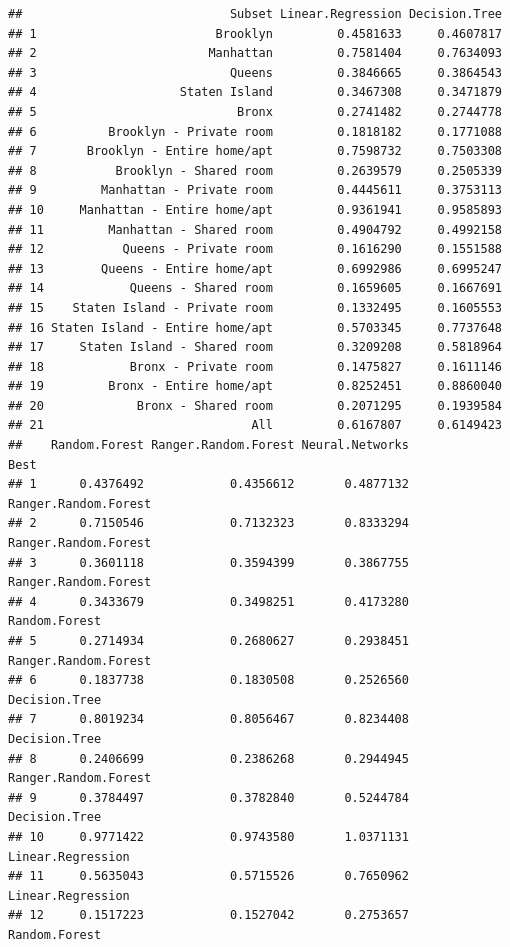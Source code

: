 \documentclass[
]{article}
\begin{document}
\begin{verbatim}
##                             Subset Linear.Regression Decision.Tree
## 1                         Brooklyn         0.4581633     0.4607817
## 2                        Manhattan         0.7581404     0.7634093
## 3                           Queens         0.3846665     0.3864543
## 4                    Staten Island         0.3467308     0.3471879
## 5                            Bronx         0.2741482     0.2744778
## 6          Brooklyn - Private room         0.1818182     0.1771088
## 7       Brooklyn - Entire home/apt         0.7598732     0.7503308
## 8           Brooklyn - Shared room         0.2639579     0.2505339
## 9         Manhattan - Private room         0.4445611     0.3753113
## 10     Manhattan - Entire home/apt         0.9361941     0.9585893
## 11         Manhattan - Shared room         0.4904792     0.4992158
## 12           Queens - Private room         0.1616290     0.1551588
## 13        Queens - Entire home/apt         0.6992986     0.6995247
## 14            Queens - Shared room         0.1659605     0.1667691
## 15    Staten Island - Private room         0.1332495     0.1605553
## 16 Staten Island - Entire home/apt         0.5703345     0.7737648
## 17     Staten Island - Shared room         0.3209208     0.5818964
## 18            Bronx - Private room         0.1475827     0.1611146
## 19         Bronx - Entire home/apt         0.8252451     0.8860040
## 20             Bronx - Shared room         0.2071295     0.1939584
## 21                             All         0.6167807     0.6149423
##    Random.Forest Ranger.Random.Forest Neural.Networks                 Best
## 1      0.4376492            0.4356612       0.4877132 Ranger.Random.Forest
## 2      0.7150546            0.7132323       0.8333294 Ranger.Random.Forest
## 3      0.3601118            0.3594399       0.3867755 Ranger.Random.Forest
## 4      0.3433679            0.3498251       0.4173280        Random.Forest
## 5      0.2714934            0.2680627       0.2938451 Ranger.Random.Forest
## 6      0.1837738            0.1830508       0.2526560        Decision.Tree
## 7      0.8019234            0.8056467       0.8234408        Decision.Tree
## 8      0.2406699            0.2386268       0.2944945 Ranger.Random.Forest
## 9      0.3784497            0.3782840       0.5244784        Decision.Tree
## 10     0.9771422            0.9743580       1.0371131    Linear.Regression
## 11     0.5635043            0.5715526       0.7650962    Linear.Regression
## 12     0.1517223            0.1527042       0.2753657        Random.Forest

\end{verbatim}
\end{document}
